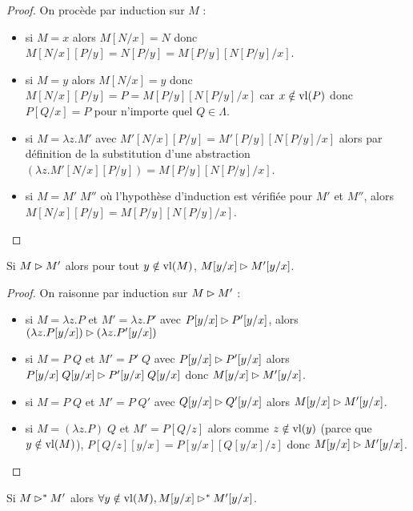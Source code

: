 \begin{proof}
    On procède par induction sur $M$ :
    \begin{itemize}[label=$\bullet$]
        \item si $M = x$ alors $M[N/x] = N$ donc $M[N/x][P/y] = N[P/y] = M[P/y][N[P/y]/x]$.
        \item si $M = y$ alors $M[N/x] = y$ donc $M[N/x][P/y] = P = M[P/y][N[P/y]/x]$ car $x\notin\mathrm{vl}(P)$ donc $P[Q/x] = P$ pour n'importe quel $Q\in\Lambda$.
        \item si $M = \lambda z.M'$ avec $M'[N/x][P/y] = M'[P/y][N[P/y]/x]$ alors par définition de la substitution d'une abstraction $(\lambda z.M'[N/x][P/y]) = M[P/y][N[P/y]/x]$.
        \item si $M = M'\;M''$ où l'hypothèse d'induction est vérifiée pour $M'$ et $M''$, alors $M[N/x][P/y] = M[P/y][N[P/y]/x]$.
    \end{itemize}
\end{proof}

\begin{prop}
    Si $M\rhd M'$ alors pour tout $y\notin\mathrm{vl}(M)$, $M[y/x]\rhd M'[y/x]$.
\end{prop}

\begin{proof}
    On raisonne par induction sur $M\rhd M'$ :
    \begin{itemize}[label=$\bullet$]
        \item si $M = \lambda z.P$ et $M'=\lambda z.P'$ avec $P[y/x]\rhd P'[y/x]$, alors $(\lambda z.P[y/x])\rhd (\lambda z.P'[y/x])$
        \item si $M = P\;Q$ et $M'=P'\;Q$ avec $P[y/x]\rhd P'[y/x]$ alors $P[y/x]\;Q[y/x]\rhd P'[y/x]\;Q[y/x]$ donc $M[y/x]\rhd M'[y/x]$.
        \item si $M = P\;Q$ et $M'=P\;Q'$ avec $Q[y/x]\rhd Q'[y/x]$ alors $M[y/x]\rhd M'[y/x]$.
        \item si $M = (\lambda z.P)\;Q$ et $M' = P[Q/z]$ alors comme $z\notin\mathrm{vl}(y)$ (parce que $y\notin\mathrm{vl}(M)$), $P[Q/z][y/x] = P[y/x][Q[y/x]/z]$ donc $M[y/x]\rhd M'[y/x]$.
    \end{itemize}
\end{proof}

\begin{prop}
    Si $M\rhd^* M'$ alors $\forall y\notin\mathrm{vl}(M), M[y/x]\rhd^* M'[y/x]$.
\end{prop}

